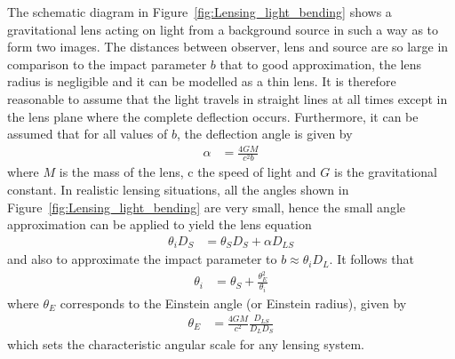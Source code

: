 		The schematic diagram in Figure~\ref{fig:Lensing_light_bending} shows a gravitational lens acting on light from a background source in such a way as to form two images. The distances between observer, lens and source are so large in comparison to the impact parameter $b$ that to good approximation, the lens radius is negligible and it can be modelled as a thin lens. It is therefore reasonable to assume that the light travels in straight lines at all times except in the lens plane where the complete deflection occurs. Furthermore, it can be assumed that for all values of $b$, the deflection angle is given by
		\begin{align}
			\alpha &= \frac{4GM}{c^2 b}
		\end{align}
		where $M$ is the mass of the lens, c the speed of light and $G$ is the gravitational constant. In realistic lensing situations, all the angles shown in Figure~\ref{fig:Lensing_light_bending} are very small, hence the small angle approximation can be applied to yield the lens equation
		\begin{align}
			\theta_i D_S &= \theta_S D_S + \alpha D_{LS}
		\end{align}
		and also to approximate the impact parameter to $b\approx\theta_i D_L$. It follows that
		\begin{align}
			\theta_i &= \theta_S + \frac{\theta_E^2}{\theta_i} \label{eq:einstein_angle}
		\end{align}
		where $\theta_E$ corresponds to the Einstein angle (or Einstein radius), given by
		\begin{align}
			\theta_E &= \frac{4GM}{c^2}\frac{D_{LS}}{D_L D_S} \label{eq:Einstein_radius}
		\end{align}
		which sets the characteristic angular scale for any lensing system\cite{Hartle}.

